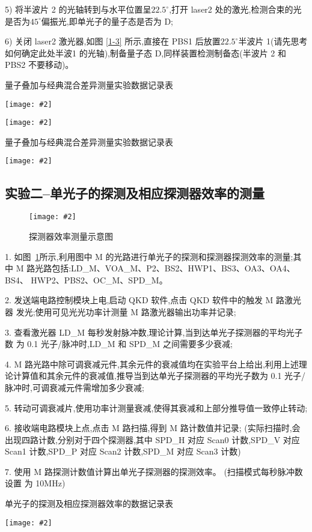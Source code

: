 \documentclass[11pt,a4paper]{ctexart}
\newcommand{\cpic}[2]{
\begin{center}
\texttt{[image: \#2]}
\end{center}
}
\newcommand{\cpicn}[3]
{
\begin{figure}[H]
\cpic{#1}{#2}
\caption{\color{red}#3\label{#2}}
\end{figure}
}
\begin{document}
5) 将半波片 2 的光轴转到与水平位置呈$22.5^{\circ}$,打开 laser2 处的激光,检测合束的光是否为$45^{\circ}$偏振光,即单光子的量子态是否为 D;

6) 关闭 laser2 激光器,如图 \ref{1-3} 所示,直接在 PBS1 后放置$22.5^{\circ}$半波片 1(请先思考如何确定此处半波1 的光轴),制备量子态 D,同样装置检测制备态(半波片 2 和 PBS2
不要移动)。
\begin{table}[H]
  \caption{量子叠加与经典混合差异测量实验数据记录表}
  \begin{center}
  \cpic{0.3}{table_1}
  \cpic{0.3}{table2}
  \end{center}
\end{table}
\begin{table}[H]
  \caption{量子叠加与经典混合差异测量实验数据记录表}
  \begin{center}
  \cpic{0.3}{table3}
  \end{center}
\end{table}
\subsection{实验二--单光子的探测及相应探测器效率的测量}
\cpicn{0.3}{2-1}{探测器效率测量示意图}
1. 如图~\ref{2-1}所示,利用图中 M 的光路进行单光子的探测和探测器探测效率的测量;其
中 M 路光路包括:LD\_M、VOA\_M、P2、BS2、HWP1、BS3、OA3、OA4、BS4、
HWP2、PBS2、OC\_M、SPD\_M。

2. 发送端电路控制模块上电,启动 QKD 软件,点击 QKD 软件中的触发 M 路激光器
发光;使用可见光光功率计测量 M 路激光器输出功率并记录;

3. 查看激光器 LD\_M 每秒发射脉冲数,理论计算,当到达单光子探测器的平均光子数
为 0.1 光子/脉冲时,LD\_M 和 SPD\_M 之间需要多少衰减;

4. M 路光路中除可调衰减元件,其余元件的衰减值均在实验平台上给出,利用上述理
论计算值和其余元件的衰减值,推导当到达单光子探测器的平均光子数为 0.1 光子/
脉冲时,可调衰减元件需增加多少衰减;

5. 转动可调衰减片,使用功率计测量衰减,使得其衰减和上部分推导值一致停止转动;

6. 接收端电路模块上点,点击 M 路扫描,得到 M 路计数值并记录;
(实际扫描时,会
出现四路计数,分别对于四个探测器,其中 SPD\_H 对应 Scan0 计数,SPD\_V 对应
Scan1 计数,SPD\_P 对应 Scan2 计数,SPD\_M 对应 Scan3 计数)

7. 使用 M 路探测计数值计算出单光子探测器的探测效率。
(扫描模式每秒脉冲数设置
为 10MHz)
\begin{table}[H]
  \caption{单光子的探测及相应探测器效率的数据记录表}
  \begin{center}
  \cpic{0.3}{exp2}
  \end{center}
\end{table}
\end{document}
